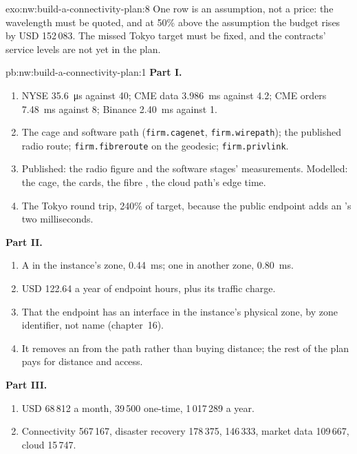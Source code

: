 \begin{solution}{exo:nw:build-a-connectivity-plan:8}
One row is an assumption, not a price: the wavelength must be quoted, and at 50\% above the assumption the budget rises by USD 152\,083.
The missed Tokyo target must be fixed, and the contracts' service levels are not yet in the plan.
\end{solution}

\begin{solution}{pb:nw:build-a-connectivity-plan:1}
\textbf{Part I.}
\begin{enumerate}
\item NYSE \qty{35.6}{\micro\second} against 40; CME data \qty{3.986}{\milli\second} against 4.2; CME orders \qty{7.48}{\milli\second}
  against 8; Binance \qty{2.40}{\milli\second} against 1.
\item The cage and software path (\texttt{firm.cagenet}, \texttt{firm.wirepath}); the published radio route; \texttt{firm.fibreroute} on
  the geodesic; \texttt{firm.privlink}.
\item Published: the radio figure and the software stages' measurements. Modelled: the cage, the cards, the fibre , the cloud
  path's edge time.
\item The Tokyo round trip, 240\% of target, because the public endpoint adds an 's two milliseconds.
\end{enumerate}
\textbf{Part II.}
\begin{enumerate}[resume]
\item A  in the instance's zone, \qty{0.44}{\milli\second}; one in another zone, \qty{0.80}{\milli\second}.
\item USD 122.64 a year of endpoint hours, plus its traffic charge.
\item That the endpoint has an interface in the instance's physical zone, by zone identifier, not name (chapter~16).
\item It removes an  from the path rather than buying distance; the rest of the plan pays for distance and access.
\end{enumerate}
\textbf{Part III.}
\begin{enumerate}[resume]
\item USD 68\,812 a month, 39\,500 one-time, 1\,017\,289 a year.
\item Connectivity 567\,167, disaster recovery 178\,375,  146\,333, market data 109\,667, cloud 15\,747.

\end{enumerate}
\end{solution}
